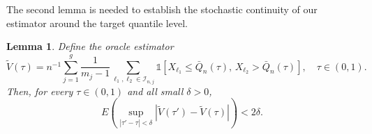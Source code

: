 \documentclass[12pt]{article}
\newtheorem{lemma}{Lemma}
\theoremstyle{remark}
\begin{document}
The second lemma is needed to establish the stochastic continuity of our estimator around the target quantile level.
\begin{lemma}\label{lem:tight}
	Define the oracle estimator
	\begin{equation*}
		\widetilde{V}(\tau)=n^{-1}\sum_{j=1}^{g}\frac{1}{m_j-1}\sum_{\ell_1,\ell_2\in \mathcal{I}_{n,j}}\mathds{1}\left[ X_{\ell_1}\leq \bar{Q}_{n}(\tau),\,
		X_{\ell_2}>\bar{Q}_{n}(\tau)\right],\quad \tau\in (0,1).
	\end{equation*}
	Then, for every $\tau\in (0,1)$ and all small $\delta>0$,
	\begin{equation*}
		E\left( \sup_{|\tau'-\tau|<\delta}\left|\widetilde{V}(\tau')-\widetilde{V}(\tau) \right|\right)   <2\delta.
	\end{equation*}
\end{lemma}
\end{document}
